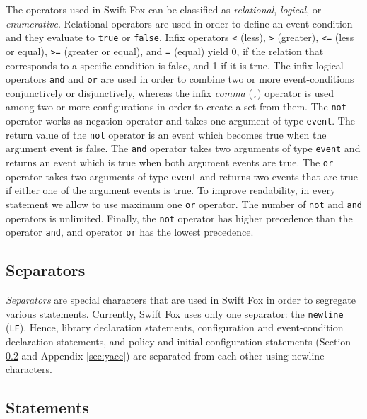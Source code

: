 The operators used in Swift Fox can be classified as \textit{relational},
\textit{logical}, or \textit{enumerative}. Relational operators are used
in order to define an event-condition and they evaluate to \texttt{true}
or \texttt{false}. Infix operators \texttt{<} (less), \texttt{>} (greater),
\texttt{<=} (less or equal), \texttt{>=} (greater or equal), and
\texttt{=} (equal) yield 0, if the relation that corresponds to a specific
condition is false, and 1 if it is true. The infix logical operators
\texttt{and} and \texttt{or} are used in order to combine two or more
event-conditions conjunctively or disjunctively, whereas the infix
\textit{comma} (\texttt{,}) operator is used among two or more
configurations in order to create a set from them. The \texttt{not} 
operator works as negation operator and takes
one argument of type \texttt{event}. The return value of the \texttt{not}
operator is an event which becomes true when the argument event is false.
The \texttt{and} operator takes two arguments of type \texttt{event} and
returns an event which is true when both argument events are true. The
\texttt{or} operator takes two arguments of type \texttt{event} and
returns two events that are true if either one of the argument events is
true. To improve readability, in every statement we allow to use maximum
one \texttt{or} operator. The number of \texttt{not} and \texttt{and}
operators is unlimited. Finally, the \texttt{not} operator has higher 
precedence than the operator \texttt{and}, and operator \texttt{or} has 
the lowest precedence. 

\subsection{Separators}
\label{sec:separators}

\textit{Separators} are special characters that are used in Swift Fox in
order to segregate various statements. Currently, Swift Fox uses only one
separator: the \texttt{newline} (\texttt{LF}). Hence, library declaration
statements, configuration and event-condition declaration statements, and
policy and initial-configuration statements (Section \ref{sec:statements}
and Appendix \ref{sec:yacc}) are separated from each other using newline
characters.

\subsection{Statements}
\label{sec:statements}

